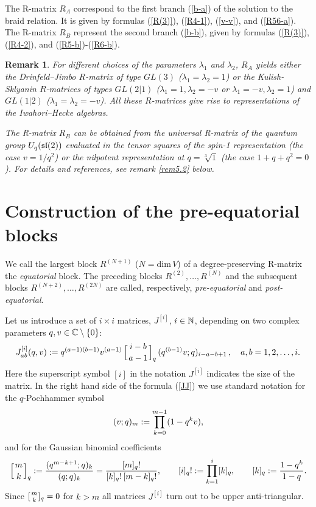 \documentclass[11pt]{article}
\def\be{\begin{equation}}\def\ee{\end{equation}}
\newcounter{theorem}\def\thetheorem{\thesection.\arabic{theorem}}\makeatletter
\newtheorem{rem}[theorem]{Remark}
\begin{document}
The R-matrix $R_A$ correspond to the first branch  (\ref{b-a}) of the solution to the braid relation. It is given by formulas (\ref{R(3)}), (\ref{R4-1}), (\ref{v-v}), and (\ref{R56-a}). The R-matrix $R_B$ represent the second branch
(\ref{b-b}), given by formulas (\ref{R(3)}), (\ref{R4-2}), and (\ref{R5-b})-(\ref{R6-b}).

\begin{rem}
	{\rm   For different choices of the parameters $\lambda_1$ and $\lambda_2$, $R_A$ yields either the Drinfeld–Jimbo $R$-matrix of type $GL(3)$   ($\lambda_1=\lambda_2=1$) or the Kulish-Sklyanin $R$-matrices of types $GL(2|1)$ ($\lambda_1=1, \lambda_2=-v$ or $\lambda_1=-v, \lambda_2=1$) and $GL(1|2)$ ($\lambda_1=\lambda_2=-v$). All these $R$-matrices give rise to representations of the Iwahori–Hecke algebras.
		
		The R-matrix $R_B$ can be obtained from the universal R-matrix of the quantum group $U_q(\frak{sl}(2))$
		evaluated in the tensor squares of the  spin-1 representation (the case $v=1/q^2$) or  the nilpotent representation at $q=\sqrt[3]{1}$ (the case $1+q+q^2=0$). For  details and  references, see remark
		\ref{rem5.2} below.		
	}
\end{rem}


\section{Construction of the pre-equatorial blocks}
We call the largest block $R^{(N+1)}$ ($N=\mbox{dim}\, V$)  of a degree-preserving R-matrix the {\em equatorial} block.
The preceding blocks $R^{(2)},\dots ,R^{(N)}$ and   the subsequent blocks  $R^{(N+2)},\ldots ,R^{(2N)}$ are called, respectively, {\em pre-equatorial} and {\em post-equatorial}.\smallskip

Let us introduce a set of $i\times i$ matrices, $J^{[i]}$, $i\in {\Bbb N}$, depending on two complex  parameters $q, v\in{\Bbb C}\setminus \{0\}$:
\be
\lb{JJ}
J^{[i]}_{ab}(q,v):=q^{(a-1)(b-1)} v^{(a-1)}\,
\Bigl[ { i-b\atop a-1}\Bigr]_q\,
(q^{(b-1)}v;q)_{i-a-b+1}\, ,\quad a,b=1,2,\dots ,i.
\ee
Here the superscript symbol $[i]$ in the notation  $J^{[i]}$ indicates the size of the matrix. In the right hand side of the formula (\ref{JJ}) we use standard notation for the $q$-Pochhammer symbol
\be
\lb{Poch}
(v;q)_m := \prod_{k=0}^{m-1} (1- q^k v),
\ee
and for the Gaussian binomial coefficients 
\be
\lb{binomial}
\Bigl[ { m\atop k}\Bigr]_q := {(q^{m-k+1};q)_{k}\over (q;q)_k} = {[m]_q!\over [k]_q!\, [m-k]_q!}, \qquad [i]_q!:= \prod_{k=1}^i [k]_q,\qquad [k]_q := {1-q^k\over 1-q}.
\ee
Since $[{m\atop k}]_q=0$ for $k>m$ all matrices $J^{[i]}$ turn out to be
upper anti-triangular.\smallskip
\end{document}
